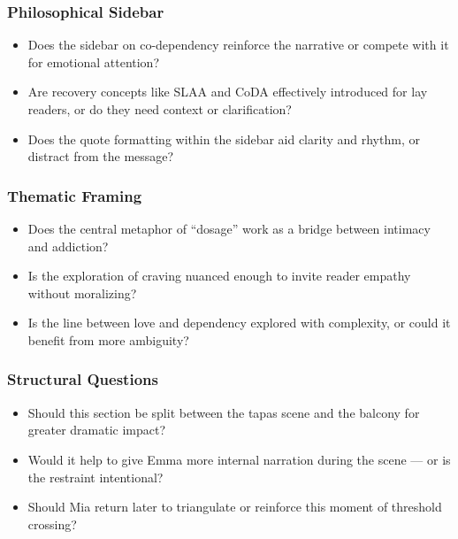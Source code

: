 \subsubsection*{Philosophical Sidebar}

\begin{itemize}
  \item Does the sidebar on co-dependency reinforce the narrative or compete with it for emotional attention?
  \item Are recovery concepts like SLAA and CoDA effectively introduced for lay readers, or do they need context or clarification?
  \item Does the quote formatting within the sidebar aid clarity and rhythm, or distract from the message?
\end{itemize}

\subsubsection*{Thematic Framing}

\begin{itemize}
  \item Does the central metaphor of ``dosage'' work as a bridge between intimacy and addiction?
  \item Is the exploration of craving nuanced enough to invite reader empathy without moralizing?
  \item Is the line between love and dependency explored with complexity, or could it benefit from more ambiguity?
\end{itemize}

\subsubsection*{Structural Questions}

\begin{itemize}
  \item Should this section be split between the tapas scene and the balcony for greater dramatic impact?
  \item Would it help to give Emma more internal narration during the scene — or is the restraint intentional?
  \item Should Mia return later to triangulate or reinforce this moment of threshold crossing?
\end{itemize}

